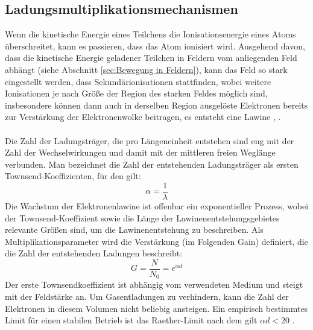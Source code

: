 		\subsection{Ladungsmultiplikationsmechanismen} \label{sec:Ladungsmultiplikation}
			Wenn die kinetische Energie eines Teilchens die Ionisationsenergie eines Atoms überschreitet, kann es passieren, dass das Atom ionisiert wird. Ausgehend davon, dass die kinetische Energie geladener Teilchen in Feldern vom anliegenden Feld abhängt (siehe Abschnitt \ref{sec:Bewegung in Feldern}), kann das Feld so stark eingestellt werden, dass Sekundärionisationen stattfinden, wobei weitere Ionisationen je nach Größe der Region des starken Feldes möglich sind, insbesondere können dann auch in derselben Region ausgelöste Elektronen bereits zur Verstärkung der Elektronenwolke beitragen, es entsteht eine Lawine \cite{Townsend}, \cite{Leo}.\\
			\\
			Die Zahl der Ladungsträger, die pro Längeneinheit entstehen sind eng mit der Zahl der Wechselwirkungen und damit mit der mittleren freien Weglänge verbunden. Man bezeichnet die Zahl der entstehenden Ladungsträger als ersten Townsend-Koeffizienten, für den gilt:
			\begin{equation*}
				\alpha=\frac{1}{\lambda}
			\end{equation*}
			Die Wachstum der Elektronenlawine ist offenbar ein exponentieller Prozess, wobei der Townsend-Koeffizient sowie die Länge der Lawinenentstehungsgebietes relevante Größen sind, um die Lawinenentstehung zu beschreiben. Als Multiplikationsparameter wird die Verstärkung (im Folgenden Gain) definiert, die die Zahl der entstehenden Ladungen beschreibt:
			\begin{equation}
				G=\frac{N}{N_{0}} = e^{\alpha d}
			\end{equation}
			Der erste Townsendkoeffizient ist abhängig vom verwendeten Medium und steigt mit der Feldstärke an. Um Gasentladungen zu verhindern, kann die Zahl der Elektronen in diesem Volumen nicht beliebig ansteigen. Ein empirisch bestimmtes Limit für einen stabilen Betrieb ist das Raether-Limit nach dem gilt $\alpha d<20$ \cite{Sauli_Multiwire}.
			
